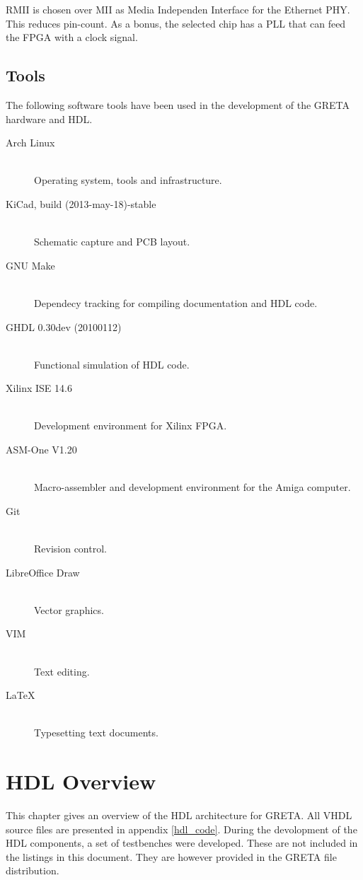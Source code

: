 \documentclass[a4paper]{report}
\begin{document}
RMII is chosen over MII as Media Independen Interface for the
Ethernet PHY. This reduces pin-count. As a bonus, the selected
chip has a PLL that can feed the FPGA with a clock signal.

\section{Tools}
The following software tools have been used in the development
of the GRETA hardware and HDL.
\begin{description}
  \item[Arch Linux] \hfill \\
  Operating system, tools and infrastructure.
  \item[KiCad, build (2013-may-18)-stable] \hfill \\
  Schematic capture and PCB layout.
  \item[GNU Make] \hfill \\
  Dependecy tracking for compiling documentation and HDL code.
  \item[GHDL 0.30dev (20100112)] \hfill \\
  Functional simulation of HDL code.
  \item[Xilinx ISE 14.6] \hfill \\
  Development environment for Xilinx FPGA.
  \item[ASM-One V1.20] \hfill \\
  Macro-assembler and development environment for the Amiga computer.
  \item[Git] \hfill \\
  Revision control.
  \item[LibreOffice Draw] \hfill \\
  Vector graphics.
  \item[VIM] \hfill \\
  Text editing.
  \item[\LaTeX] \hfill \\
  Typesetting text documents.
\end{description}

\chapter{HDL Overview}
This chapter gives an overview of the HDL architecture for
GRETA. All VHDL source files are presented in appendix \ref{hdl_code}.
During the devolopment of the HDL components, a set of testbenches were
developed. These are not included in the listings in this document. They
are however provided in the GRETA file distribution.
\end{document}
